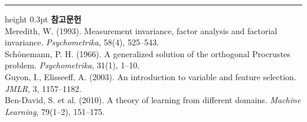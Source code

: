 \documentclass[10pt]{article}
\begin{document}
\vspace{0.6em}
\hrule height 0.3pt
\vspace{0.5em}
{\footnotesize
\textbf{참고문헌}\\[0.3em]
Meredith, W. (1993). Measurement invariance, factor analysis and factorial
invariance. \emph{Psychometrika}, 58(4), 525--543.\\[0.15em]
Schönemann, P. H. (1966). A generalized solution of the orthogonal Procrustes
problem. \emph{Psychometrika}, 31(1), 1--10.\\[0.15em]
Guyon, I., Elisseeff, A. (2003). An introduction to variable and feature selection.
\emph{JMLR}, 3, 1157--1182.\\[0.15em]
Ben-David, S. et al. (2010). A theory of learning from different domains.
\emph{Machine Learning}, 79(1--2), 151--175.
}
\end{document}
